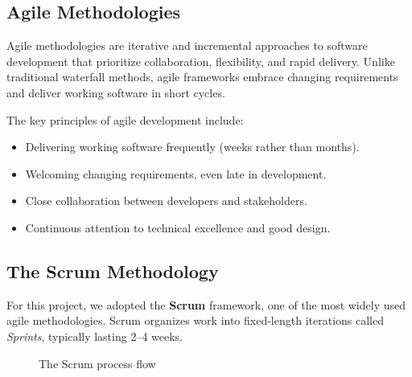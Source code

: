 \documentclass[12pt,a4paper,oneside]{report}
\begin{document}
\subsection{Agile Methodologies}
Agile methodologies are iterative and incremental approaches to software development that prioritize collaboration, flexibility, and rapid delivery. Unlike traditional waterfall methods, agile frameworks embrace changing requirements and deliver working software in short cycles.

The key principles of agile development include:
\begin{itemize}
    \item Delivering working software frequently (weeks rather than months).
    \item Welcoming changing requirements, even late in development.
    \item Close collaboration between developers and stakeholders.
    \item Continuous attention to technical excellence and good design.
\end{itemize}

\subsection{The Scrum Methodology}

For this project, we adopted the \textbf{Scrum} framework, one of the most widely used agile methodologies. Scrum organizes work into fixed-length iterations called \textit{Sprints}, typically lasting 2--4 weeks.

\begin{figure}[H]
\centering
{}
\caption{The Scrum process flow}
\label{fig:scrum_process}
\end{figure}
\end{document}
